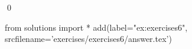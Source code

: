 
\begin{ex} 
  \label{ex:exercises6}
  
  \qed
\end{ex} 
\begin{python0}
from solutions import *
add(label="ex:exercises6",
    srcfilename='exercises/exercises6/answer.tex') 
\end{python0}
